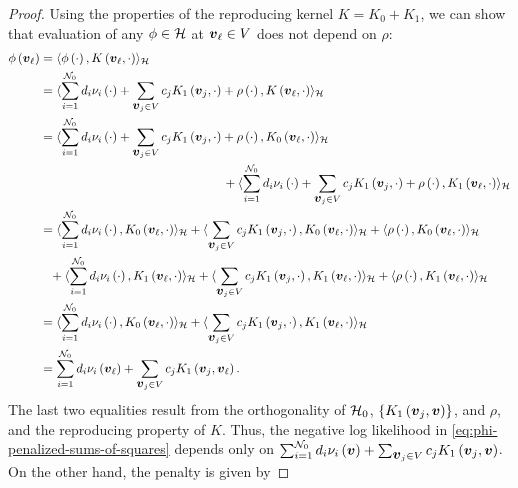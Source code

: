 \begin{proof}
\bigskip

Using the properties of the reproducing kernel $K = K_0 + K_1$, we can show that evaluation of any $\phi \in \mathcal{H}$ at $\mbox{\boldmath $v$}_\ell \in V$ does not depend on $\rho$:
\begin{align*}
 \phi\left(\bfv_{\ell}\right) &= \langle \phi\left(\cdot\right), K\left(\bfv_{\ell}, \cdot\right) \rangle_\hilbert \\
&=  \langle  \sum_{i = 1}^{\mathcal{N}_0} d_i \nu_i\left(\cdot\right) + \sum_{\bfv_{j} \in V} c_j K_1\left(\bfv_j, \cdot\right) + \rho\left(\cdot\right), K\left(\bfv_{\ell}, \cdot\right) \rangle_\hilbert \\
&= \langle  \sum_{i = 1}^{\mathcal{N}_0} d_i \nu_i\left(\cdot\right) + \sum_{\bfv_{j} \in V} c_j K_1\left(\bfv_j, \cdot\right) + \rho\left(\cdot\right), K_0\left(\bfv_{\ell}, \cdot\right) \rangle_\hilbert \\
&\phantom{= \langle  \sum_{i = 1}^{\mathcal{N}_0} d_i \nu_i\left(\cdot\right) + \sum_{\bfv_{j} \in V} c_j K_1\left(\bfv_j, \cdot\right) \rangle}+ \langle \sum_{i = 1}^{\mathcal{N}_0} d_i \nu_i\left(\cdot\right) + \sum_{\bfv_{j} \in V} c_j K_1\left(\bfv_j, \cdot\right) + \rho\left(\cdot\right), K_1\left(\bfv_{\ell}, \cdot\right) \rangle_\hilbert \\
&=  \langle  \sum_{i = 1}^{\mathcal{N}_0} d_i \nu_i\left(\cdot\right) ,  K_0\left(\bfv_{\ell}, \cdot\right) \rangle_\hilbert +  \langle   \sum_{\bfv_{j} \in V} c_j K_1\left(\bfv_j, \cdot\right)  ,  K_0\left(\bfv_{\ell}, \cdot\right) \rangle_\hilbert + \langle \rho\left(\cdot\right), K_0\left(\bfv_{\ell}, \cdot\right) \rangle_\hilbert \\ 
&\phantom{=} + \langle  \sum_{i = 1}^{\mathcal{N}_0} d_i \nu_i\left(\cdot\right) ,  K_1\left(\bfv_{\ell}, \cdot\right) \rangle_\hilbert +  \langle   \sum_{\bfv_{j} \in V} c_j K_1\left(\bfv_j, \cdot\right)  ,  K_1\left(\bfv_{\ell}, \cdot\right) \rangle_\hilbert + \langle \rho\left(\cdot\right), K_1\left(\bfv_{\ell}, \cdot\right) \rangle_\hilbert \\
&=  \langle  \sum_{i = 1}^{\mathcal{N}_0} d_i \nu_i\left(\cdot\right) ,  K_0\left(\bfv_{\ell}, \cdot\right) \rangle_\hilbert  + \langle   \sum_{\bfv_{j} \in V} c_j K_1\left(\bfv_j, \cdot\right)  ,  K_1\left(\bfv_{\ell}, \cdot\right) \rangle_\hilbert\\
&=   \sum_{i = 1}^{\mathcal{N}_0} d_i \nu_i\left(\bfv_\ell\right)  + \sum_{\bfv_{j} \in V} c_j K_1\left(\bfv_j, \bfv_\ell\right).
\end{align*}
\noindent
The last two equalities result from the orthogonality of $\mathcal{H}_0$, $\left\{K_1\left(\mbox{\boldmath $v$}_{j}, \mbox{\boldmath $v$}\right) \right\}$, and $\rho$, and the reproducing property of $K$. Thus, the negative log likelihood in \eqref{eq:phi-penalized-sums-of-squares} depends only on $\sum_{i = 1}^{\mathcal{N}_0} d_i \nu_i\left(\mbox{\boldmath $v$}\right)  + \sum_{\mbox{\boldmath $v$}_{j} \in V} c_j K_1\left(\mbox{\boldmath $v$}_j, \mbox{\boldmath $v$}\right)$. On the other hand, the penalty is given by

\end{proof}
